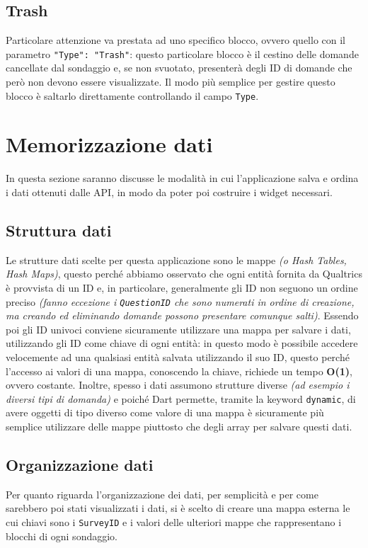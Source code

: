 \subsection{Trash}
Particolare attenzione va prestata ad uno specifico blocco, ovvero quello con il parametro \texttt{"Type": "Trash"}: questo particolare blocco è il cestino delle domande cancellate dal sondaggio e, se non svuotato, presenterà degli ID di domande che però non devono essere visualizzate. Il modo più semplice per gestire questo blocco è saltarlo direttamente controllando il campo \texttt{Type}.

\section{Memorizzazione dati}
In questa sezione saranno discusse le modalità in cui l'applicazione salva e ordina i dati ottenuti dalle API, in modo da poter poi costruire i widget necessari.

\subsection{Struttura dati}
Le strutture dati scelte per questa applicazione sono le mappe \textit{(o Hash Tables, Hash Maps)}, questo perché abbiamo osservato che ogni entità fornita da Qualtrics è provvista di un ID e, in particolare, generalmente gli ID non seguono un ordine preciso \textit{(fanno eccezione i \texttt{QuestionID} che sono numerati in ordine di creazione, ma creando ed eliminando domande possono presentare comunque salti)}. Essendo poi gli ID univoci conviene sicuramente utilizzare una mappa per salvare i dati, utilizzando gli ID come chiave di ogni entità: in questo modo è possibile accedere velocemente ad una qualsiasi entità salvata utilizzando il suo ID, questo perché l'accesso ai valori di una mappa, conoscendo la chiave, richiede un tempo \textbf{O(1)}, ovvero costante\cite{hashmaps}.
Inoltre, spesso i dati assumono strutture diverse \textit{(ad esempio i diversi tipi di domanda)} e poiché Dart permette, tramite la keyword \texttt{dynamic}, di avere oggetti di tipo diverso come valore di una mappa è sicuramente più semplice utilizzare delle mappe piuttosto che degli array per salvare questi dati.

\subsection{Organizzazione dati}
Per quanto riguarda l'organizzazione dei dati, per semplicità e per come sarebbero poi stati visualizzati i dati, si è scelto di creare una mappa esterna le cui chiavi sono i \texttt{SurveyID} e i valori delle ulteriori mappe che rappresentano i blocchi di ogni sondaggio.

